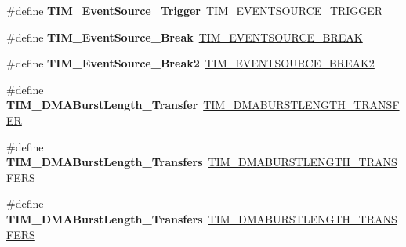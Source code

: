 \begin{DoxyCompactItemize}
\#define {\bfseries T\+I\+M\+\_\+\+Event\+Source\+\_\+\+Trigger}~\mbox{\hyperlink{group___t_i_m___event___source_ga85573ed76442490db67e4b759fe6d901}{T\+I\+M\+\_\+\+E\+V\+E\+N\+T\+S\+O\+U\+R\+C\+E\+\_\+\+T\+R\+I\+G\+G\+ER}}
\item 
\mbox{\label{group___h_a_l___t_i_m___aliased___defines_gad6f9b5366d93c73ff005273c50c9f00a}} 
\#define {\bfseries T\+I\+M\+\_\+\+Event\+Source\+\_\+\+Break}~\mbox{\hyperlink{group___t_i_m___event___source_ga83d16368fe3172a98c41d7c414780a64}{T\+I\+M\+\_\+\+E\+V\+E\+N\+T\+S\+O\+U\+R\+C\+E\+\_\+\+B\+R\+E\+AK}}
\item 
\mbox{\label{group___h_a_l___t_i_m___aliased___defines_ga18fcfb87d3361c3118e7251d5a99b92a}} 
\#define {\bfseries T\+I\+M\+\_\+\+Event\+Source\+\_\+\+Break2}~\mbox{\hyperlink{group___t_i_m___event___source_ga1fc597b9937cc1cbc09b0e4450ad55fc}{T\+I\+M\+\_\+\+E\+V\+E\+N\+T\+S\+O\+U\+R\+C\+E\+\_\+\+B\+R\+E\+A\+K2}}
\item 
\mbox{\label{group___h_a_l___t_i_m___aliased___defines_gab87f91f1c5583b9888cb6bb37fc639e2}} 
\#define {\bfseries T\+I\+M\+\_\+\+D\+M\+A\+Burst\+Length\+\_\+Transfer}~\mbox{\hyperlink{group___t_i_m___d_m_a___burst___length_ga74f07b4a10022d71f31ec6e1b2b69276}{T\+I\+M\+\_\+\+D\+M\+A\+B\+U\+R\+S\+T\+L\+E\+N\+G\+T\+H\+\_\+T\+R\+A\+N\+S\+F\+ER}}
\item 
\mbox{\label{group___h_a_l___t_i_m___aliased___defines_ga829504c3e8c90a9445f6a223bc3034f8}} 
\#define {\bfseries T\+I\+M\+\_\+\+D\+M\+A\+Burst\+Length\+\_\+Transfers}~\mbox{\hyperlink{group___t_i_m___d_m_a___burst___length_gab114592091a00e0a6b9ae464485bd7bb}{T\+I\+M\+\_\+\+D\+M\+A\+B\+U\+R\+S\+T\+L\+E\+N\+G\+T\+H\+\_\+T\+R\+A\+N\+S\+F\+E\+RS}}
\item 
\mbox{\label{group___h_a_l___t_i_m___aliased___defines_ga3a99863a0925e0cc9a11b91aade66f11}} 
\#define {\bfseries T\+I\+M\+\_\+\+D\+M\+A\+Burst\+Length\+\_\+Transfers}~\mbox{\hyperlink{group___t_i_m___d_m_a___burst___length_gad91c14f0930803593ecdbd98002fea0a}{T\+I\+M\+\_\+\+D\+M\+A\+B\+U\+R\+S\+T\+L\+E\+N\+G\+T\+H\+\_\+T\+R\+A\+N\+S\+F\+E\+RS}}
\item 

\end{DoxyCompactItemize}
